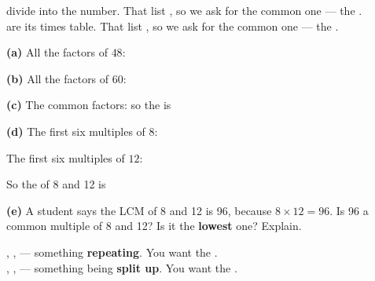\documentclass[12pt,a4paper]{article}
\begin{document}

\begin{remember}
   divide into the number. That list , so we ask for the
   common one --- the . \\
   are its times table. That list , so we ask for the
   common one --- the .
\end{remember}

\noindent\textbf{(a)} All the factors of $48$: \blank[10.2cm]

\vspace{6pt}
\noindent\textbf{(b)} All the factors of $60$: \blank[10.2cm]

\vspace{6pt}
\noindent\textbf{(c)} The common factors: \blank[5.4cm] so the  is
\blank[2.2cm]

\vspace{9pt}
\noindent\textbf{(d)} The first six multiples of $8$: \blank[8.4cm]

\vspace{6pt}
\noindent\hspace*{1.2em}The first six multiples of $12$: \blank[8.2cm]

\vspace{6pt}
\noindent\hspace*{1.2em}So the  of 8 and 12 is \blank[2.6cm]

\vspace{9pt}
\noindent\textbf{(e)} A student says the LCM of 8 and 12 is 96, because
$8 \times 12 = 96$. Is 96 a common multiple of 8 and 12? Is it the \textbf{lowest}
one? Explain.


\begin{wordhelp}
   \sep {} \sep {} --- something
  \textbf{repeating}. You want the . \\
   \sep {} \sep
   --- something being \textbf{split up}. You want the .
\end{wordhelp}
\end{document}
